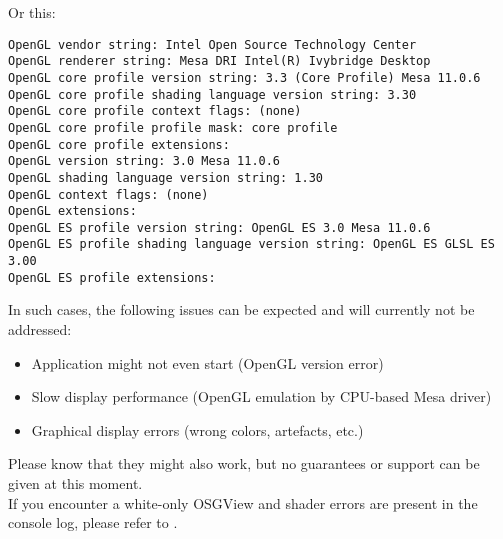 Or this:

\begin{lstlisting}
OpenGL vendor string: Intel Open Source Technology Center
OpenGL renderer string: Mesa DRI Intel(R) Ivybridge Desktop 
OpenGL core profile version string: 3.3 (Core Profile) Mesa 11.0.6
OpenGL core profile shading language version string: 3.30
OpenGL core profile context flags: (none)
OpenGL core profile profile mask: core profile
OpenGL core profile extensions:
OpenGL version string: 3.0 Mesa 11.0.6
OpenGL shading language version string: 1.30
OpenGL context flags: (none)
OpenGL extensions:
OpenGL ES profile version string: OpenGL ES 3.0 Mesa 11.0.6
OpenGL ES profile shading language version string: OpenGL ES GLSL ES 3.00
OpenGL ES profile extensions:
\end{lstlisting}

In such cases, the following issues can be expected and will currently not be addressed:

\begin{itemize} 
\item Application might not even start (OpenGL version error)
\item Slow display performance (OpenGL emulation by CPU-based Mesa driver)
\item Graphical display errors (wrong colors, artefacts, etc.) 
\end{itemize} 

Please know that they might also work, but no guarantees or support can be given at this moment. \\

If you encounter a white-only OSGView and shader errors are present in the console log, please refer to .


